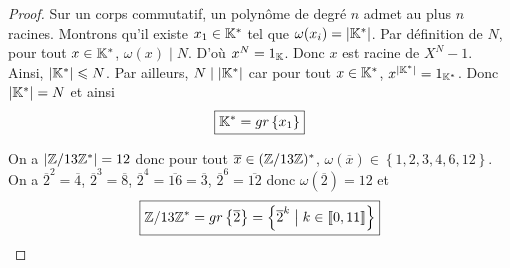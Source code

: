 \begin{proof}
	Sur un corps commutatif, un polynôme de degré $n$ admet au plus $n$ racines. Montrons qu'il existe $x_{1}\in\mathbb{K}^{*}$ tel que $\omega(x_{i})=\vert\mathbb{K}^{*}\vert$. Par définition de $N$, pour tout $x\in\mathbb{K}^{*}$, $\omega(x)\mid N$. D'où $x^{N}=1_{\mathbb{K}}$. Donc $x$ est racine de $X^{N}-1$. Ainsi, $\vert\mathbb{K}^{*}\vert\leqslant N$. Par ailleurs, $N\mid\vert\mathbb{K}^{*}\vert$ car pour tout $x\in\mathbb{K}^{*}$, $x^{\vert\mathbb{K}^{*}\vert}=1_{\mathbb{K}^{*}}$. Donc $\vert\mathbb{K}^{*}\vert=N$ et ainsi 
	\begin{equation}
		\boxed{\mathbb{K}^{*}=gr\left\{x_{1}\right\}}
	\end{equation}

	On a $\vert\mathbb{Z}/13\mathbb{Z}^{*}\vert=12$ donc pour tout $\overline{x}\in(\mathbb{Z}/13\mathbb{Z})^{*}$, $\omega(\overline{x})\in\left\{1,2,3,4,6,12\right\}$. On a $\overline{2}^{2}=\overline{4}$, $\overline{2}^{3}=\overline{8}$, $\overline{2}^{4}=\overline{16}=\overline{3}$, $\overline{2}^{6}=\overline{12}$ donc $\omega(\overline{2})=12$ et 
	\begin{equation}
		\boxed{
		\mathbb{Z}/13\mathbb{Z}^{*}=gr\left\{\overline{2}\right\}=\left\{\overline{2}^{k}\bigm| k\in\left\llbracket 0,11\right\rrbracket\right\}}
	\end{equation}
\end{proof}

